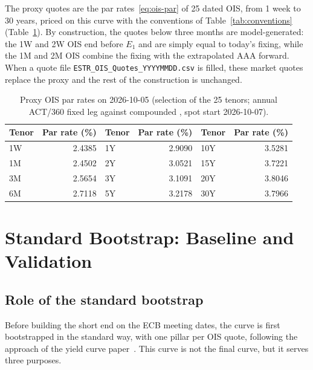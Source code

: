 \documentclass[11pt,a4paper]{article}
\theoremstyle{plain}
\theoremstyle{definition}
\newcommand{\estr}{\text{\texteuro STR}}
\begin{document}
The proxy quotes are the par rates~\eqref{eq:ois-par} of 25 dated OIS, from 1 week to 30 years, priced on this curve with the conventions of Table~\ref{tab:conventions} (Table~\ref{tab:proxy-quotes}). By construction, the quotes below three months are model-generated: the 1W and 2W OIS end before $E_1$ and are simply equal to today's fixing, while the 1M and 2M OIS combine the fixing with the extrapolated AAA forward. When a quote file \texttt{ESTR\_OIS\_Quotes\_YYYYMMDD.csv} is filled, these market quotes replace the proxy and the rest of the construction is unchanged.

\begin{table}[htbp]
\centering
\small
\begin{tabular}{@{}lrlrlr@{}}
\toprule
Tenor & Par rate (\%) & Tenor & Par rate (\%) & Tenor & Par rate (\%) \\
\midrule
1W & 2.4385 & 1Y & 2.9090 & 10Y & 3.5281 \\
1M & 2.4502 & 2Y & 3.0521 & 15Y & 3.7221 \\
3M & 2.5654 & 3Y & 3.1091 & 20Y & 3.8046 \\
6M & 2.7118 & 5Y & 3.2178 & 30Y & 3.7966 \\
\bottomrule
\end{tabular}
\caption{Proxy \estr{} OIS par rates on 2026-10-05 (selection of the 25 tenors; annual ACT/360 fixed leg against compounded \estr{}, spot start 2026-10-07).}
\label{tab:proxy-quotes}
\end{table}

\clearpage
\section{Standard Bootstrap: Baseline and Validation}
\label{sec:standard}

\subsection{Role of the standard bootstrap}

Before building the short end on the ECB meeting dates, the curve is first
bootstrapped in the standard way, with one pillar per OIS quote, following the
approach of the yield curve paper~\cite{yieldcurve}. This curve is not the
final \estr{} curve, but it serves three purposes.
\end{document}
